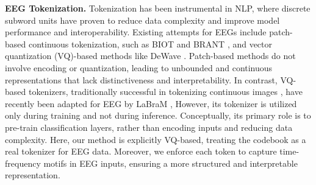 \noindent\textbf{EEG Tokenization. }
Tokenization has been instrumental in NLP, where discrete subword units have proven to reduce data complexity and improve model performance and interoperability. 
Existing attempts for EEGs include patch-based continuous tokenization, such as BIOT \cite{yang2024biot} and BRANT \cite{zhang2024brant}, and vector quantization (VQ)-based methods like DeWave \cite{duan2023dewave}.
Patch-based methods do not involve encoding or quantization, leading to unbounded and continuous representations that lack distinctiveness and interpretability.
In contrast, VQ-based tokenizers, traditionally successful in tokenizing continuous images \cite{esser2020taming}, have recently been adapted for EEG by LaBraM \cite{jiang2024large},
However, its tokenizer is utilized only during training and not during inference. 
Conceptually, its primary role is to pre-train classification layers, rather than encoding inputs and reducing data complexity.
Here, our method is explicitly VQ-based, treating the codebook as a real tokenizer for EEG data.
Moreover, we enforce each token to capture time-frequency motifs\cite{xu2023rebar} in EEG inputs, ensuring a more structured and interpretable representation.




